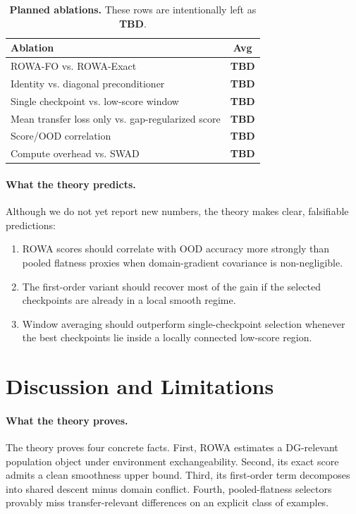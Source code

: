 \documentclass{article}
\newcommand{\TBD}{\textbf{TBD}}
\newcommand{\ood}{OOD}
\newcommand{\rowa}{\textup{\textsc{ROWA}}}
\newcommand{\swad}{\textup{\textsc{SWAD}}}
\begin{document}
\begin{table}[t]
    \centering
    \small
    \caption{\textbf{Planned ablations.} These rows are intentionally left as \TBD{}.}
    \label{tab:ablations}
    \begin{tabular}{lc}
        \toprule
        Ablation & Avg \\
        \midrule
        \rowa{}-FO vs. \rowa{}-Exact & \TBD \\
        Identity vs. diagonal preconditioner & \TBD \\
        Single checkpoint vs. low-score window & \TBD \\
        Mean transfer loss only vs. gap-regularized score & \TBD \\
        Score/\ood{} correlation & \TBD \\
        Compute overhead vs. \swad{} & \TBD \\
        \bottomrule
    \end{tabular}
\end{table}

\paragraph{What the theory predicts.}
Although we do not yet report new numbers, the theory makes clear, falsifiable predictions:
\begin{enumerate}[leftmargin=1.4em]
    \item \rowa{} scores should correlate with \ood{} accuracy more strongly than pooled flatness proxies when domain-gradient covariance is non-negligible.
    \item The first-order variant should recover most of the gain if the selected checkpoints are already in a local smooth regime.
    \item Window averaging should outperform single-checkpoint selection whenever the best checkpoints lie inside a locally connected low-score region.
\end{enumerate}

\section{Discussion and Limitations}

\paragraph{What the theory proves.}
The theory proves four concrete facts. First, \rowa{} estimates a DG-relevant population object under environment exchangeability. Second, its exact score admits a clean smoothness upper bound. Third, its first-order term decomposes into shared descent minus domain conflict. Fourth, pooled-flatness selectors provably miss transfer-relevant differences on an explicit class of examples.
\end{document}
